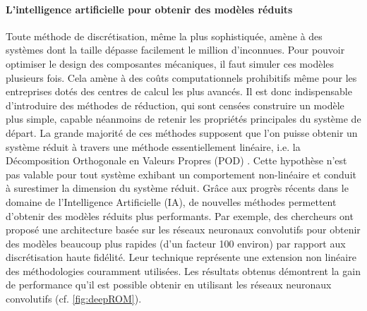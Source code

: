\documentclass[12pt, french]{article}
\begin{document}
\paragraph{\large L'intelligence artificielle pour obtenir des modèles réduits\\}
Toute méthode de discrétisation, même la plus sophistiquée, amène à des systèmes dont la taille dépasse facilement le million d'inconnues. Pour pouvoir optimiser le design des composantes mécaniques, il faut simuler ces modèles plusieurs fois. Cela amène à des coûts computationnels prohibitifs même pour les entreprises dotés des centres de calcul les plus avancés. Il est donc indispensable d'introduire des méthodes de réduction, qui sont censées construire un modèle plus simple, capable néanmoins de retenir les propriétés principales du système de départ. La grande majorité de ces méthodes supposent que l'on puisse obtenir un système réduit à travers une méthode essentiellement linéaire, i.e. la Décomposition Orthogonale en Valeurs Propres (POD) \cite{shinde2019,tello2020fluid}. Cette hypothèse n'est pas valable pour tout système exhibant un comportement non-linéaire et conduit à surestimer la dimension du système réduit. Grâce aux progrès récents dans le domaine de l'Intelligence Artificielle (IA), de nouvelles méthodes permettent d'obtenir des modèles réduits plus performants. Par exemple, des chercheurs ont proposé une architecture basée sur les réseaux neuronaux convolutifs \cite{lee2020} pour obtenir des modèles beaucoup plus rapides (d'un facteur 100 environ) par rapport aux discrétisation haute fidélité. Leur technique représente une extension non linéaire des méthodologies couramment utilisées. Les résultats obtenus démontrent la gain de performance qu'il est possible obtenir en utilisant les réseaux neuronaux convolutifs (cf. \ref{fig:deepROM}).
\end{document}
